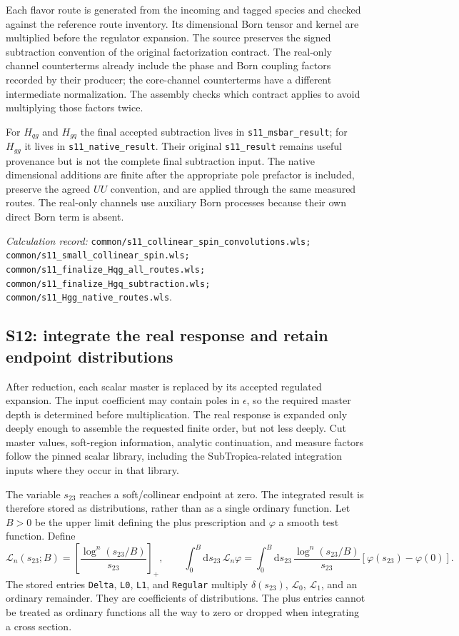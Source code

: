 \documentclass[11pt,a4paper]{article}
\newcommand{\dd}{\mathrm{d}}
\newcommand{\eps}{\epsilon}
\newcommand{\code}[1]{{\small\nolinkurl{#1}}}
\newcommand{\pathref}[1]{\par{\footnotesize\textit{Calculation record:} \code{#1}.}\par}
\begin{document}
Each flavor route is generated from the incoming and tagged species and checked against the reference route inventory. Its dimensional Born tensor and kernel are multiplied before the regulator expansion. The source preserves the signed subtraction convention of the original factorization contract. The real-only channel counterterms already include the phase and Born coupling factors recorded by their producer; the core-channel counterterms have a different intermediate normalization. The assembly checks which contract applies to avoid multiplying those factors twice.

For $H_{qg}$ and $H_{gq}$ the final accepted subtraction lives in \code{s11_msbar_result}; for $H_{gg}$ it lives in \code{s11_native_result}. Their original \code{s11_result} remains useful provenance but is not the complete final subtraction input. The native dimensional additions are finite after the appropriate pole prefactor is included, preserve the agreed $UU$ convention, and are applied through the same measured routes. The real-only channels use auxiliary Born processes because their own direct Born term is absent.
\pathref{common/s11_collinear_spin_convolutions.wls; common/s11_small_collinear_spin.wls; common/s11_finalize_Hqg_all_routes.wls; common/s11_finalize_Hgq_subtraction.wls; common/s11_Hgg_native_routes.wls}

\subsection{S12: integrate the real response and retain endpoint distributions}
After reduction, each scalar master is replaced by its accepted regulated expansion. The input coefficient may contain poles in $\eps$, so the required master depth is determined before multiplication. The real response is expanded only deeply enough to assemble the requested finite order, but not less deeply. Cut master values, soft-region information, analytic continuation, and measure factors follow the pinned scalar library, including the SubTropica-related integration inputs where they occur in that library.

The variable $s_{23}$ reaches a soft/collinear endpoint at zero. The integrated result is therefore stored as distributions, rather than as a single ordinary function. Let $B>0$ be the upper limit defining the plus prescription and $\varphi$ a smooth test function. Define
\begin{equation}
 \mathcal L_n(s_{23};B)=\left[\frac{\log^n(s_{23}/B)}{s_{23}}\right]_+,
 \qquad
 \int_0^B\!\dd s_{23}\,\mathcal L_n\varphi
 =\int_0^B\!\dd s_{23}\,
 \frac{\log^n(s_{23}/B)}{s_{23}}
 [\varphi(s_{23})-\varphi(0)].
\end{equation}
The stored entries \code{Delta}, \code{L0}, \code{L1}, and \code{Regular} multiply $\delta(s_{23})$, $\mathcal L_0$, $\mathcal L_1$, and an ordinary remainder. They are coefficients of distributions. The plus entries cannot be treated as ordinary functions all the way to zero or dropped when integrating a cross section.
\end{document}
